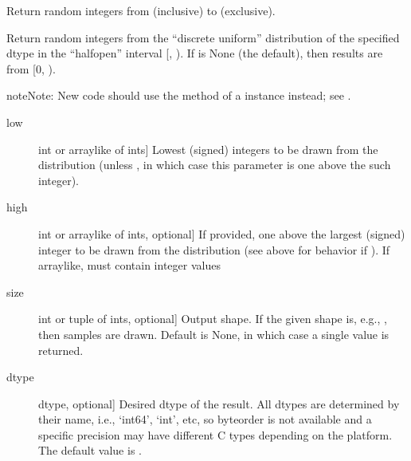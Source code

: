 \documentclass[letterpaper,10pt,english]{sphinxmanual}
\begin{document}
\begin{fulllineitems}
\label{\detokenize{infrapy.utils:infrapy.utils.ref2sac.randint}}
Return random integers from  (inclusive) to  (exclusive).

Return random integers from the “discrete uniform” distribution of
the specified dtype in the “half\sphinxhyphen{}open” interval {[}, ). If
 is None (the default), then results are from {[}0, ).

\begin{sphinxadmonition}{note}{Note:}
New code should use the  method of a 
instance instead; see .
\end{sphinxadmonition}
\begin{description}
\item[{low}] \leavevmode{[}int or array\sphinxhyphen{}like of ints{]}
Lowest (signed) integers to be drawn from the distribution (unless
, in which case this parameter is one above the
 such integer).

\item[{high}] \leavevmode{[}int or array\sphinxhyphen{}like of ints, optional{]}
If provided, one above the largest (signed) integer to be drawn
from the distribution (see above for behavior if ).
If array\sphinxhyphen{}like, must contain integer values

\item[{size}] \leavevmode{[}int or tuple of ints, optional{]}
Output shape.  If the given shape is, e.g., , then
 samples are drawn.  Default is None, in which case a
single value is returned.

\item[{dtype}] \leavevmode{[}dtype, optional{]}
Desired dtype of the result. All dtypes are determined by their
name, i.e., ‘int64’, ‘int’, etc, so byteorder is not available
and a specific precision may have different C types depending
on the platform. The default value is .


\end{description}
\end{fulllineitems}
\end{document}
